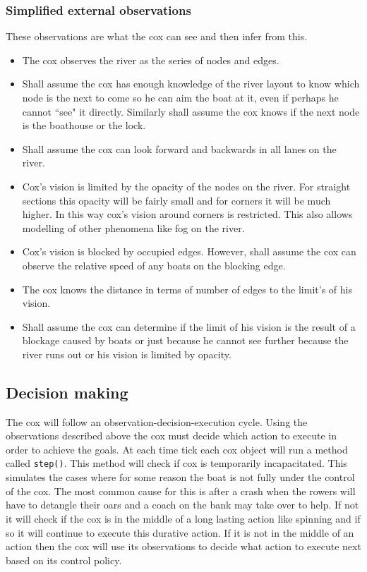       \subsubsection{Simplified external observations}
      These observations are what the cox can see and then infer from this.
      \begin{itemize}
        \item The cox observes the river as the series of nodes and edges.
        \item Shall assume the cox has enough knowledge of the river layout to know which node is the next to come so he can aim the boat at it, even if perhaps he cannot ``see" it directly. Similarly shall assume the cox knows if the next node is the boathouse or the lock.
        \item Shall assume the cox can look forward and backwards in all lanes on the river.
        \item Cox's vision is limited by the opacity of the nodes on the river. For straight sections this opacity will be fairly small and for corners it will be much higher. In this way cox's vision around corners is restricted. This also allows modelling of other phenomena like fog on the river.
        \item Cox's vision is blocked by occupied edges. However, shall assume the cox can observe the relative speed of any boats on the blocking edge.
        \item The cox knows the distance in terms of number of edges to the limit's of his vision.
        \item Shall assume the cox can determine if the limit of his vision is the result of a blockage caused by boats or just because he cannot see further because the river runs out or his vision is limited by opacity.
      \end{itemize}
      
      \subsection{Decision making}
      The cox will follow an observation-decision-execution cycle. Using the observations described above the cox must decide which action to execute in order to achieve the goals. At each time tick each cox object will run a method called \texttt{step()}. This method will check if cox is temporarily incapacitated. This simulates the cases where for some reason the boat is not fully under the control of the cox. The most common cause for this is after a crash when the rowers will have to detangle their oars and a coach on the bank may take over to help. If not it will check if the cox is in the middle of a long lasting action like spinning and if so it will continue to execute this durative action. If it is not in the middle of an action then the cox will use its observations to decide what action to execute next based on its control policy.
      
